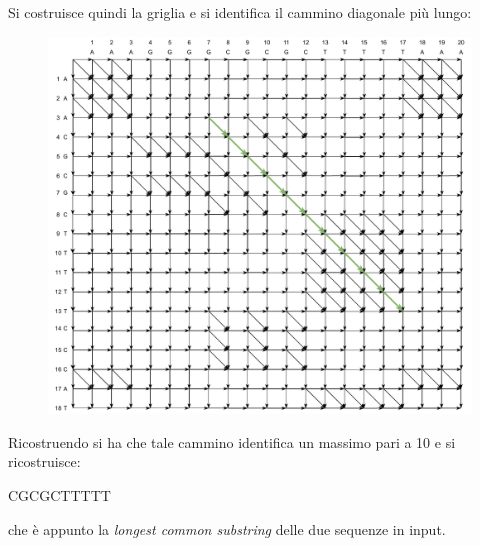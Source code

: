 \documentclass[a4paper,12pt, oneside]{book}
\begin{document}
Si costruisce quindi la griglia e si identifica il cammino diagonale più lungo:
\begin{figure}[H]
  \centering
  \includegraphics[scale = 0.62]{img/es4.pdf}
\end{figure}
Ricostruendo si ha che tale cammino identifica un massimo pari a 10 e si
ricostruisce: 
\begin{center}
  CGCGCTTTTT
\end{center}
che è appunto la \textit{longest common substring} delle due sequenze in input.
\end{document}

